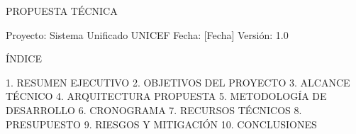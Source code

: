 PROPUESTA TÉCNICA

Proyecto: Sistema Unificado UNICEF
Fecha: [Fecha]
Versión: 1.0

ÍNDICE

1. RESUMEN EJECUTIVO
2. OBJETIVOS DEL PROYECTO
3. ALCANCE TÉCNICO
4. ARQUITECTURA PROPUESTA
5. METODOLOGÍA DE DESARROLLO
6. CRONOGRAMA
7. RECURSOS TÉCNICOS
8. PRESUPUESTO
9. RIESGOS Y MITIGACIÓN
10. CONCLUSIONES